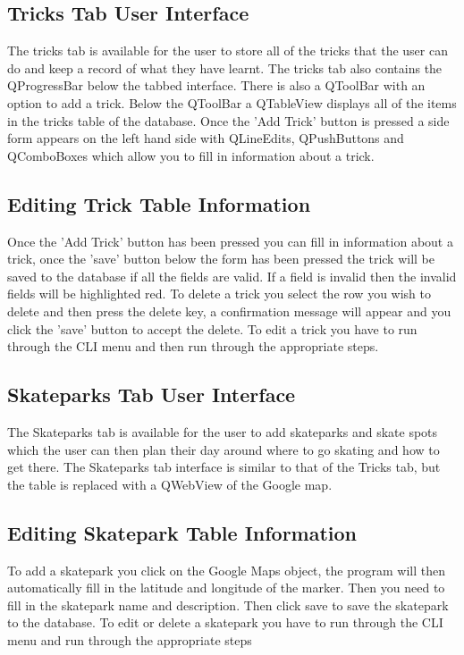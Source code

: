 \subsection{Tricks Tab User Interface}

The tricks tab is available for the user to store all of the tricks that the user can do and keep a record of what they have learnt. The tricks tab also contains the QProgressBar below the tabbed interface. There is also a QToolBar with an option to add a trick. Below the QToolBar a QTableView displays all of the items in the tricks table of the database. Once the 'Add Trick' button is pressed a side form appears on the left hand side with QLineEdits, QPushButtons and QComboBoxes which allow you to fill in information about a trick.

\subsection{Editing Trick Table Information}

Once the 'Add Trick' button has been pressed you can fill in information about a trick, once the 'save' button below the form has been pressed the trick will be saved to the database if all the fields are valid. If a field is invalid then the invalid fields will be highlighted red. To delete a trick you select the row you wish to delete and then press the delete key, a confirmation message will appear and you click the 'save' button to accept the delete. To edit a trick you have to run through the CLI menu and then run through the appropriate steps.



\subsection{Skateparks Tab User Interface}

The Skateparks tab is available for the user to add skateparks and skate spots which the user can then plan their day around where to go skating and how to get there. The Skateparks tab interface is similar to that of the Tricks tab, but the table is replaced with a QWebView of the Google map.

\subsection{Editing Skatepark Table Information}

To add a skatepark you click on the Google Maps object, the program will then automatically fill in the latitude and longitude of the marker. Then you need to fill in the skatepark name and description. Then click save to save the skatepark to the database. To edit or delete a skatepark you have to run through the CLI menu and run through the appropriate steps



